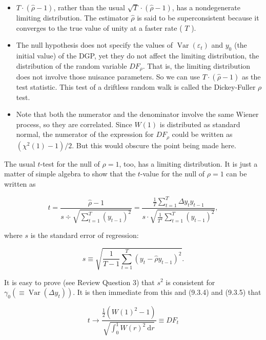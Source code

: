 \documentclass[10pt]{article}
\begin{document}
\begin{itemize}
  \item $T \cdot(\hat{\rho}-1)$, rather than the usual $\sqrt{T} \cdot(\hat{\rho}-1)$, has a nondegenerate limiting distribution. The estimator $\hat{\rho}$ is said to be superconsistent because it converges to the true value of unity at a faster rate ( $T$ ).
  \item The null hypothesis does not specify the values of $\operatorname{Var}\left(\varepsilon_{t}\right)$ and $y_{0}$ (the initial value) of the DGP, yet they do not affect the limiting distribution, the distribution of the random variable $D F_{\rho}$. That is, the limiting distribution does not involve those nuisance parameters. So we can use $T \cdot(\hat{\rho}-1)$ as the test statistic. This test of a driftless random walk is called the Dickey-Fuller $\rho$ test.
  \item Note that both the numerator and the denominator involve the same Wiener process, so they are correlated. Since $W(1)$ is distributed as standard normal, the numerator of the expression for $D F_{\rho}$ could be written as $\left(\chi^{2}(1)-1\right) / 2$. But this would obscure the point being made here.
\end{itemize}

The usual $t$-test for the null of $\rho=1$, too, has a limiting distribution. It is just a matter of simple algebra to show that the $t$-value for the null of $\rho=1$ can be written as


\begin{equation*}
t=\frac{\hat{\rho}-1}{s \div \sqrt{\sum_{t=1}^{T}\left(y_{t-1}\right)^{2}}}=\frac{\frac{1}{T} \sum_{t=1}^{T} \Delta y_{t} y_{t-1}}{s \cdot \sqrt{\frac{1}{T^{2}} \sum_{t=1}^{T}\left(y_{t-1}\right)^{2}}}, \tag{9.3.7}
\end{equation*}


where $s$ is the standard error of regression:


\begin{equation*}
s \equiv \sqrt{\frac{1}{T-1} \sum_{t=1}^{T}\left(y_{t}-\hat{\rho} y_{t-1}\right)^{2}} . \tag{9.3.8}
\end{equation*}


It is easy to prove (see Review Question 3) that $s^{2}$ is consistent for $\gamma_{0}\left(\equiv \operatorname{Var}\left(\Delta y_{t}\right)\right)$. It is then immediate from this and (9.3.4) and (9.3.5) that


\begin{equation*}
t \rightarrow \frac{\frac{1}{2}\left(W(1)^{2}-1\right)}{\sqrt{\int_{0}^{1} W(r)^{2} \mathrm{~d} r}} \equiv D F_{t} \tag{9.3.9}
\end{equation*}
\end{document}
